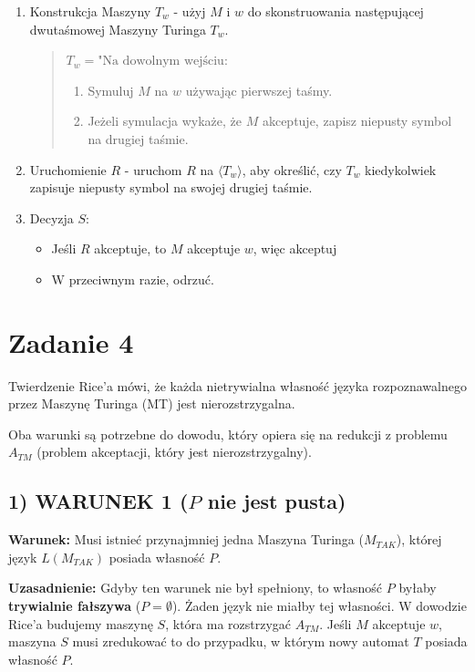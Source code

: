 \documentclass{article}
\begin{document}
\begin{enumerate}
    \item Konstrukcja Maszyny $T_w$ - użyj $M$ i $w$ do skonstruowania następującej dwutaśmowej Maszyny Turinga $T_w$.
    \begin{quote}
    $T_w = \text{"Na dowolnym wejściu}$:
    \begin{enumerate}
        \item Symuluj $M$ na $w$ używając pierwszej taśmy.
        \item Jeżeli symulacja wykaże, że $M$ akceptuje, zapisz niepusty symbol na drugiej taśmie.
    \end{enumerate}
    \end{quote}

    \item Uruchomienie $R$ - uruchom $R$ na $\langle T_w \rangle$, aby określić, czy $T_w$ kiedykolwiek zapisuje niepusty symbol na swojej drugiej taśmie.

    \item Decyzja $S$:
    \begin{itemize}
        \item Jeśli $R$ akceptuje, to $M$ akceptuje $w$, więc akceptuj
        \item W przeciwnym razie, odrzuć.
    \end{itemize}
\end{enumerate}

\section{Zadanie 4}
Twierdzenie Rice'a mówi, że każda nietrywialna własność języka rozpoznawalnego przez Maszynę Turinga (MT) jest nierozstrzygalna.


Oba warunki są potrzebne do dowodu, który opiera się na redukcji z problemu $A_{TM}$ (problem akceptacji, który jest nierozstrzygalny).

\subsection*{1) WARUNEK 1 ($P$ nie jest pusta)}

\textbf{Warunek:} Musi istnieć przynajmniej jedna Maszyna Turinga ($M_{TAK}$), której język $L(M_{TAK})$ posiada własność $P$.

\textbf{Uzasadnienie:}
Gdyby ten warunek nie był spełniony, to własność $P$ byłaby \textbf{trywialnie fałszywa} ($P = \emptyset$). Żaden język nie miałby tej własności.
W dowodzie Rice'a budujemy maszynę $S$, która ma rozstrzygać $A_{TM}$. Jeśli $M$ akceptuje $w$, maszyna $S$ musi zredukować to do przypadku, w którym nowy automat $T$ posiada własność $P$.
\end{document}
